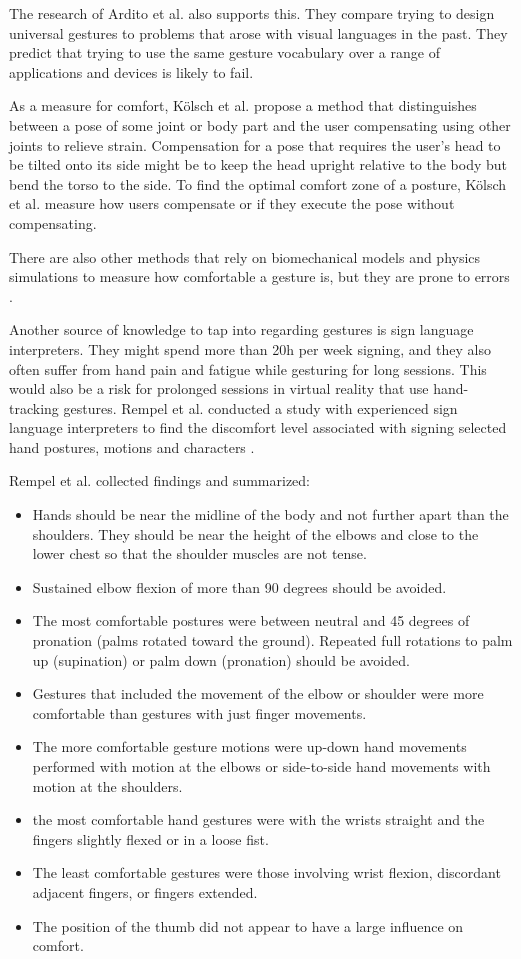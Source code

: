 The research of Ardito et al. \cite{Ardito2014} also supports this. They compare trying to design universal gestures to problems that arose with visual languages in the past. They predict that trying to use the same gesture vocabulary over a range of applications and devices is likely to fail. 


As a measure for comfort, Kölsch et al. propose a method that distinguishes between a pose of some joint or body part and the user compensating using other joints to relieve strain. Compensation for a pose that requires the user's head to be tilted onto its side might be to keep the head upright relative to the body but bend the torso to the side. To find the optimal comfort zone of a posture, Kölsch et al. \cite{Koelsch} measure how users compensate or if they execute the pose without compensating. 

There are also other methods that rely on biomechanical models and physics simulations to measure how comfortable a gesture is, but they are prone to errors \cite{Stern2006}.

Another source of knowledge to tap into regarding gestures is sign language interpreters. They might spend more than 20h per week signing, and they also often suffer from hand pain and fatigue while gesturing for long sessions. This would also be a risk for prolonged sessions in virtual reality that use hand-tracking gestures. Rempel et al. conducted a study with experienced sign language interpreters to find the discomfort level associated with signing selected hand postures, motions and characters \cite{Rempel2014}. 

Rempel et al. \cite{Rempel2014} collected findings and summarized:
\begin{itemize}
  \item Hands should be near the midline of the body and not further apart than the shoulders. They should be near the height of the elbows and close to the lower chest so that the shoulder muscles are not tense. 
  \item Sustained elbow flexion of more than 90 degrees should be avoided.
  \item The most comfortable postures were between neutral and 45 degrees of pronation (palms rotated toward the ground). Repeated full rotations to palm up (supination) or palm down (pronation) should be avoided.
  \item Gestures that included the movement of the elbow or shoulder were more comfortable than gestures with just finger movements.
  \item The more comfortable gesture motions were up-down hand movements performed with motion at the elbows or side-to-side hand movements with motion at the shoulders. 
  \item the most comfortable hand gestures were with the wrists straight and the fingers slightly flexed or in a loose fist.
  \item The least comfortable gestures were those involving wrist flexion, discordant adjacent fingers, or fingers extended.
  \item The position of the thumb did not appear to have a large influence on comfort.
\end{itemize}



